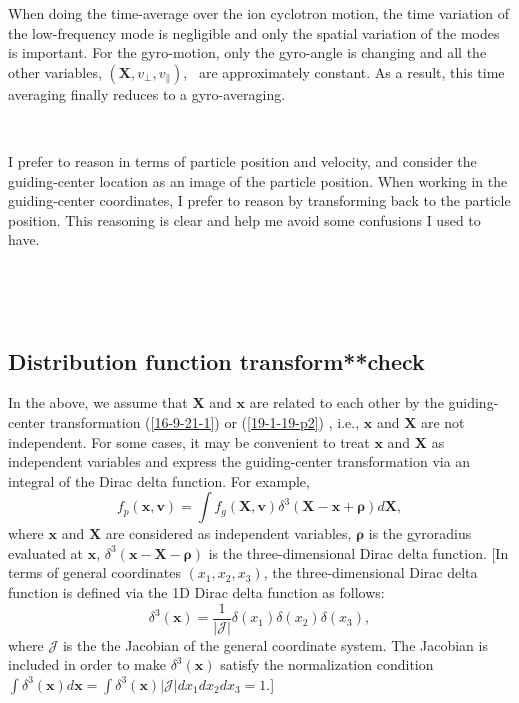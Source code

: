 \documentclass{article}
\newcommand{\tmmathbf}[1]{\ensuremath{\boldsymbol{#1}}}
\begin{document}
When doing the time-average over the ion cyclotron motion, the time variation
of the low-frequency mode is negligible and only the spatial variation of the
modes is important. For the gyro-motion, only the gyro-angle is changing and
all the other variables, $(\mathbf{X}, v_{\perp}, v_{\parallel})$, \ are
approximately constant. As a result, this time averaging finally reduces to a
gyro-averaging.

\

I prefer to reason in terms of particle position and velocity, and consider
the guiding-center location as an image of the particle position. When working
in the guiding-center coordinates, I prefer to reason by transforming back to
the particle position. This reasoning is clear and help me avoid some
confusions I used to have.

\

\

\subsection{Distribution function transform**check}

In the above, we assume that $\mathbf{X}$ and $\mathbf{x}$ are related to each
other by the guiding-center transformation (\ref{16-9-21-1}) or
(\ref{19-1-19-p2}) , i.e., $\mathbf{x}$ and $\mathbf{X}$ are not independent.
For some cases, it may be convenient to treat $\mathbf{x}$ and $\mathbf{X}$ as
independent variables and express the guiding-center transformation via an
integral of the Dirac delta function. For example,
\begin{equation}
  \label{19-1-20-e1} f_p (\mathbf{x}, \mathbf{v}) = \int f_g (\mathbf{X},
  \mathbf{v}) \delta^3 (\mathbf{X}-\mathbf{x}+\tmmathbf{\rho}) d\mathbf{X},
\end{equation}
where $\mathbf{x}$ and $\mathbf{X}$ are considered as independent variables,
$\tmmathbf{\rho}$ is the gyroradius evaluated at $\mathbf{x}$, $\delta^3
(\mathbf{x}-\mathbf{X}-\tmmathbf{\rho})$ is the three-dimensional Dirac delta
function. [In terms of general coordinates $(x_1, x_2, x_3)$, the
three-dimensional Dirac delta function is defined via the 1D Dirac delta
function as follows:
\begin{equation}
  \delta^3 (\mathbf{x}) = \frac{1}{| \mathcal{J} |} \delta (x_1) \delta (x_2)
  \delta (x_3),
\end{equation}
where $\mathcal{J}$ is the the Jacobian of the general coordinate system. The
Jacobian is included in order to make $\delta^3 (\mathbf{x})$ satisfy the
normalization condition $\int \delta^3 (\mathbf{x}) d\mathbf{x}= \int \delta^3
(\mathbf{x}) | \mathcal{J} | d x_1 d x_2 d x_3 = 1$.]
\end{document}
